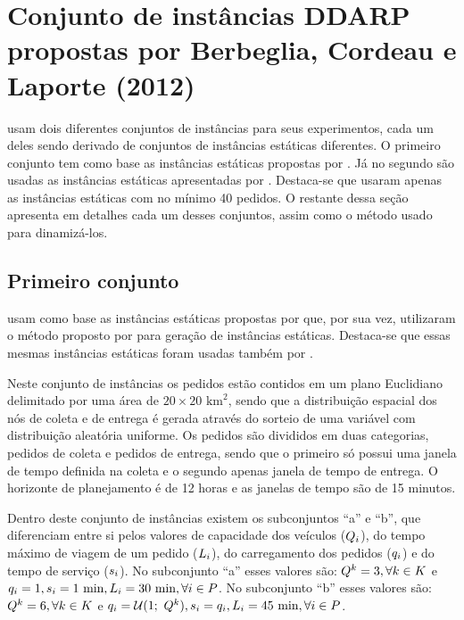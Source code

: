 \section{Conjunto de instâncias DDARP propostas por 
         Berbeglia, Cordeau e Laporte (2012)}
\label{sec:instances_berbeglia}

\textcite{berbeglia_hybrid_tabu_2012} usam dois diferentes conjuntos de 
instâncias para seus experimentos, cada um deles sendo derivado de conjuntos 
de instâncias estáticas diferentes.
O primeiro conjunto tem como base as instâncias estáticas propostas por 
\textcite{ropke_models_2007}.
Já no segundo são usadas as instâncias estáticas apresentadas por
\textcite{cordeau_tabu_2003}.
Destaca-se que \textcite{berbeglia_hybrid_tabu_2012} usaram apenas as 
instâncias estáticas com no mínimo 40 pedidos.
O restante dessa seção apresenta em detalhes cada um desses conjuntos, assim
como o método usado para dinamizá-los.

\subsection{Primeiro conjunto}\label{sec:instances_berbeglia_1}
\textcite{berbeglia_hybrid_tabu_2012} usam como base as instâncias estáticas 
propostas por \textcite{ropke_models_2007} que, por sua vez, utilizaram o 
método proposto por \textcite{savelsbergh_drive:_1998} para geração de 
instâncias estáticas.
Destaca-se que essas mesmas instâncias estáticas foram usadas também por
\textcite{cordeau_branch-and-cut_2006}.

Neste conjunto de instâncias os pedidos estão contidos em um plano Euclidiano
delimitado por uma área de $20 \times 20 \text{ km}^2$, sendo que a 
distribuição espacial dos nós de coleta e de entrega é gerada através do 
sorteio de uma variável com distribuição aleatória uniforme.
Os pedidos são divididos em duas categorias, pedidos de coleta e pedidos de
entrega, sendo que o primeiro só possui uma janela de tempo definida na coleta 
e o segundo apenas janela de tempo de entrega.
O horizonte de planejamento é de 12 horas e as janelas de tempo são de 15
minutos.

Dentro deste conjunto de instâncias existem os subconjuntos ``a'' e ``b'',
que diferenciam entre si pelos valores de capacidade dos veículos 
($Q_i$), do tempo máximo de viagem de um pedido 
($L_i$), do carregamento dos pedidos 
($q_i$) e do tempo de serviço ($s_i$).
No subconjunto ``a'' esses valores são: $Q^{k} = 3, \forall
k \in K$ e $\load_\request = 1, \serviceTime_\request = 1\ 
\text{min}, \maxRideTime_\request = 30\ \text{min}, \forall \request \in
\requests$.
No subconjunto ``b'' esses valores são: $Q^{k} = 6, \forall
k \in K$ e $q_i = \mathcal{U}(1;\ Q^{k}), s_i = q_i, 
L_i = 45\ \text{min}, \forall i \in P$.


